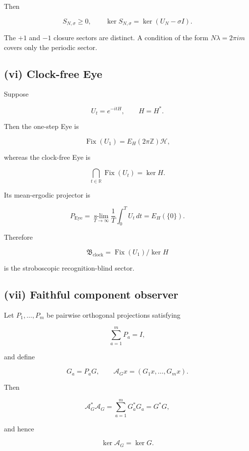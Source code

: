 Then

\[
\boxed{
S_{N,\sigma}\ge0,
\qquad
\ker S_{N,\sigma}=\ker(U_N-\sigma I).
}
\tag{3.23}
\]

The \(+1\) and \(-1\) closure sectors are distinct. A condition of the form
\(N\lambda=2\pi i m\) covers only the periodic sector.

\hypertarget{vi-clock-free-eye}{%
\subsection{(vi) Clock-free Eye}\label{vi-clock-free-eye}}

Suppose

\[
U_t=e^{-itH},
\qquad H=H^*.
\]

Then the one-step Eye is

\[
\boxed{
\operatorname{Fix}(U_1)=E_H(2\pi\mathbb Z)\mathcal H,
}
\tag{3.24}
\]

whereas the clock-free Eye is

\[
\boxed{
\bigcap_{t\in\mathbb R}\operatorname{Fix}(U_t)=\ker H.
}
\tag{3.25}
\]

Its mean-ergodic projector is

\[
\boxed{
P_{\mathrm{Eye}}
=
\operatorname*{s-lim}_{T\to\infty}
\frac1T\int_0^T U_t\,dt
=
E_H(\{0\}).
}
\tag{3.26}
\]

Therefore

\[
\boxed{
\mathfrak B_{\mathrm{clock}}
=
\operatorname{Fix}(U_1)/\ker H
}
\tag{3.27}
\]

is the stroboscopic recognition-blind sector.

\hypertarget{vii-faithful-component-observer}{%
\subsection{(vii) Faithful component observer}\label{vii-faithful-component-observer}}

Let \(P_1,\ldots,P_m\) be pairwise orthogonal projections satisfying

\[
\sum_{a=1}^mP_a=I,
\]

and define

\[
G_a=P_aG,
\qquad
\mathcal A_Gx=(G_1x,\ldots,G_mx).
\tag{3.28}
\]

Then

\[
\boxed{
\mathcal A_G^*\mathcal A_G
=
\sum_{a=1}^mG_a^*G_a
=
G^*G,
}
\tag{3.29}
\]

and hence

\[
\boxed{\ker\mathcal A_G=\ker G.}
\tag{3.30}
\]

